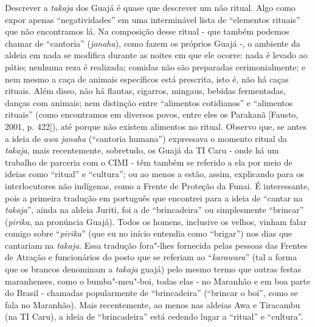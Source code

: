 Descrever a \emph{takaja} dos Guajá é quase que descrever um não ritual.
Algo como expor apenas ``negatividades'' em uma interminável lista de
``elementos rituais'' que não encontramos lá. Na composição desse ritual
- que também podemos chamar de ``cantoria'' (\emph{janaha}), como fazem
os próprios Guajá -, o ambiente da aldeia em nada se modifica durante as
noites em que ele ocorre: nada é levado ao pátio; nenhuma reza é
realizada; comidas não são preparadas cerimonialmente; e nem mesmo a
caça de animais específicos está prescrita, isto é, não há caças
rituais. Além disso, não há flautas, cigarros, mingaus, bebidas
fermentadas, danças com animais; nem distinção entre ``alimentos
cotidianos'' e ``alimentos rituais'' (como encontramos em diversos povos,
entre eles os Parakanã {[}Fausto, 2001, p. 422{]}), até porque não
existem alimentos no ritual. Observo que, se antes a ideia de \emph{awa
janaha} (``cantoria humana'') expressava o momento ritual da
\emph{takaja}, mais recentemente, sobretudo, os Guajá da TI Caru - onde
há um trabalho de parceria com o CIMI - têm também se referido a ela por
meio de ideias como ``ritual'' e ``cultura''; ou ao menos a estão,
assim, explicando para os interlocutores não indígenas, como a Frente de
Proteção da Funai. É interessante, pois a primeira tradução em português
que encontrei para a ideia de ``cantar na \emph{takaja}'', ainda na
aldeia Juriti, foi a de ``brincadeira'' ou simplesmente ``brincar''
(\emph{pirika}, na pronúncia Guajá). Todos os homens, inclusive os
velhos, vinham falar comigo sobre ``\emph{pirika}'' (que eu no início
entendia como ``brigar'') nos dias que cantariam na \emph{takaja}. Essa
tradução fora"-lhes fornecida pelas pessoas das Frentes de Atração e
funcionários do posto que se referiam ao ``\emph{karawara}'' (tal a
forma que os brancos denominam a \emph{takaja} guajá) pelo mesmo termo
que outras festas maranhenses, como o bumba"-meu"-boi, todas elas - no
Maranhão e em boa parte do Brasil - chamadas popularmente de
``brincadeira'' (``brincar o boi'', como se fala no Maranhão). Mais
recentemente, ao menos nas aldeias Awa e Tiracambu (na TI Caru), a ideia
de ``brincadeira'' está cedendo lugar a ``ritual'' e ``cultura''.

